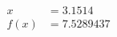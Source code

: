 \documentclass[preview]{standalone}
\begin{document}
\begin{align*}
x &= 3.1514\\f(x) &= 7.5289437
\end{align*}
\end{document}

